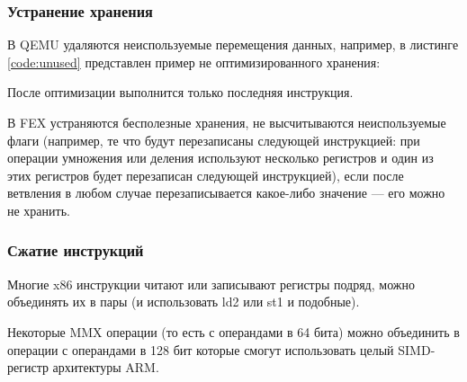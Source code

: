 \subsubsection{Устранение хранения}

В QEMU удаляются неиспользуемые перемещения данных, например, в листинге \ref{code:unused} представлен пример не оптимизированного хранения:


После оптимизации выполнится только последняя инструкция.

В FEX устраняются бесполезные хранения, не высчитываются неиспользуемые флаги (например, те что будут перезаписаны следующей инструкцией: при операции умножения или деления используют несколько регистров и один из этих регистров будет перезаписан следующей инструкцией), если после ветвления в любом случае перезаписывается какое-либо значение --- его можно не хранить.

\subsubsection{Сжатие инструкций}

Многие x86 инструкции читают или записывают регистры подряд, можно объединять их в пары (и использовать ld2 или st1 и подобные).

Некоторые MMX операции (то есть с операндами в 64 бита) можно объединить в операции с операндами в 128 бит которые смогут использовать целый SIMD-регистр архитектуры ARM.

